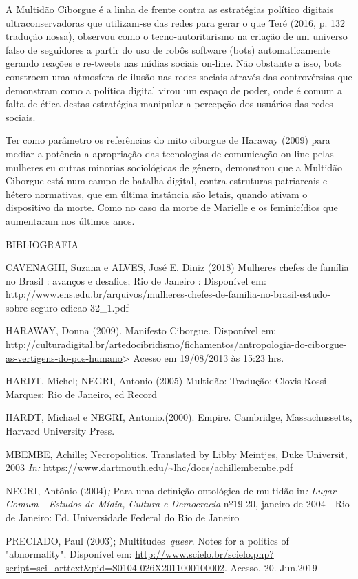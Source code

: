 A Multidão Ciborgue é a linha de frente contra as estratégias político
digitais ultraconservadoras que utilizam-se das redes para gerar o que
Teré (2016, p. 132 tradução nossa), observou como o tecno-autoritarismo
na criação de um universo falso de seguidores a partir do uso de robôs
software (bots) automaticamente gerando reações e re-tweets nas mídias
sociais on-line. Não obstante a isso, bots constroem uma atmosfera de
ilusão nas redes sociais através das controvérsias que demonstram como a
política digital virou um espaço de poder, onde é comum a falta de ética
destas estratégias manipular a percepção dos usuários das redes sociais.

Ter como parâmetro os referências do mito ciborgue de Haraway (2009)
para mediar a potência a apropriação das tecnologias de comunicação
on-line pelas mulheres eu outras minorias sociológicas de gênero,
demonstrou que a Multidão Ciborgue está num campo de batalha digital,
contra estruturas patriarcais e hétero normativas, que em última
instância são letais, quando ativam o dispositivo da morte. Como no caso
da morte de Marielle e os feminicídios que aumentaram nos últimos anos.

BIBLIOGRAFIA

CAVENAGHI, Suzana e ALVES, José E. Diniz (2018) Mulheres chefes de
família no Brasil : avanços e desafios; Rio de Janeiro : Disponível em:
http://www.ens.edu.br/arquivos/mulheres-chefes-de-familia-no-brasil-estudo-sobre-seguro-edicao-32\_1.pdf

HARAWAY, Donna (2009). Manifesto Ciborgue. Disponível em:
\url{http://culturadigital.br/artedocibridismo/fichamentos/antropologia-do-ciborgue-as-vertigens-do-pos-humano}\textgreater{}
Acesso em 19/08/2013 às 15:23 hrs.

HARDT, Michel; NEGRI, Antonio (2005) Multidão: Tradução: Clovis Rossi
Marques; Rio de Janeiro, ed Record

HARDT, Michael e NEGRI, Antonio.(2000). Empire. Cambridge,
Massachussetts, Harvard University Press.

MBEMBE, Achille; Necropolitics. Translated by Libby Meintjes, Duke
Universit, 2003 \emph{In:}
\url{https://www.dartmouth.edu/~lhc/docs/achillembembe.pdf}

NEGRI, Antônio (2004)\emph{;} Para uma definição ontológica de multidão
in\emph{: Lugar Comum - Estudos de Mídia, Cultura e Democracia} nº19-20,
janeiro de 2004 - Rio de Janeiro: Ed. Universidade Federal do Rio de
Janeiro

PRECIADO, Paul (2003); Multitudes~\emph{queer}. Notes for a politics of
"abnormality". Disponível em:
\url{http://www.scielo.br/scielo.php?script=sci_arttext\&pid=S0104-026X2011000100002}.
Acesso. 20. Jun.2019

